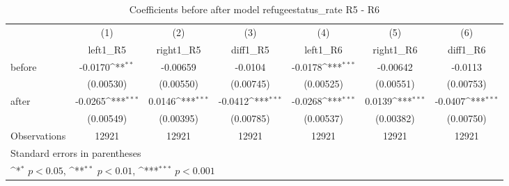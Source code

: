 \begin{table}[!ht]\centering \footnotesize
\def\sym#1{\ifmmode^{#1}\else\(^{#1}\)\fi}
\caption{Coefficients before after model refugeestatus\_rate R5 - R6}
\begin{tabular}{l*{6}{c}}
\hline\hline
                    &\multicolumn{1}{c}{(1)}&\multicolumn{1}{c}{(2)}&\multicolumn{1}{c}{(3)}&\multicolumn{1}{c}{(4)}&\multicolumn{1}{c}{(5)}&\multicolumn{1}{c}{(6)}\\
                    &\multicolumn{1}{c}{left1\_R5}&\multicolumn{1}{c}{right1\_R5}&\multicolumn{1}{c}{diff1\_R5}&\multicolumn{1}{c}{left1\_R6}&\multicolumn{1}{c}{right1\_R6}&\multicolumn{1}{c}{diff1\_R6}\\
\hline
before              &     -0.0170\sym{**} &    -0.00659         &     -0.0104         &     -0.0178\sym{***}&    -0.00642         &     -0.0113         \\
                    &   (0.00530)         &   (0.00550)         &   (0.00745)         &   (0.00525)         &   (0.00551)         &   (0.00753)         \\
[1em]
after               &     -0.0265\sym{***}&      0.0146\sym{***}&     -0.0412\sym{***}&     -0.0268\sym{***}&      0.0139\sym{***}&     -0.0407\sym{***}\\
                    &   (0.00549)         &   (0.00395)         &   (0.00785)         &   (0.00537)         &   (0.00382)         &   (0.00750)         \\
\hline
Observations        &       12921         &       12921         &       12921         &       12921         &       12921         &       12921         \\
\hline\hline
\multicolumn{7}{l}{\footnotesize Standard errors in parentheses}\\
\multicolumn{7}{l}{\footnotesize \sym{*} \(p<0.05\), \sym{**} \(p<0.01\), \sym{***} \(p<0.001\)}\\
\end{tabular}
\end{table}
